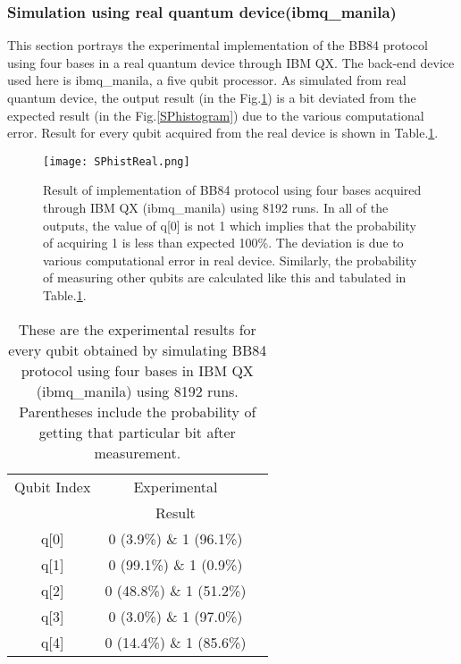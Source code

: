 \documentclass[superscriptaddress,twocolumn,showpacs,prb,floatfix]{revtex4}
\begin{document}
\subsubsection{Simulation using real quantum device(ibmq\_manila)}
\label{SecIIAii}

This section portrays the experimental implementation of the BB84 protocol using four bases in a real quantum device through IBM QX. The back-end device used here is ibmq\_manila, a five qubit processor. As simulated from real quantum device, the output result (in the Fig.\ref{SPhistReal}) is a bit deviated from the expected result (in the Fig.\ref{SPhistogram}) due to the various computational error. Result for every qubit acquired from the real device is shown in Table.\ref{qkdtable5}.

\begin{figure}[H]
    \centering
    \texttt{[image: SPhistReal.png]}
    \caption{Result of implementation of BB84 protocol using four bases acquired through IBM QX (ibmq\_manila) using 8192 runs. In all of the outputs, the value of q[0] is not 1 which implies that the probability of acquiring 1 is less than expected 100\%. The deviation is due to various computational error in real device. Similarly, the probability of measuring other qubits are calculated like this and tabulated in Table.\ref{qkdtable5}.}
    \label{SPhistReal}
\end{figure}

\begin{table}[ht]
    \centering
    \begin{tabular}{|c|c|c|}
    \hline\hline
    Qubit Index & Experimental\\ & Result \\ [0.5ex]
    \hline
    q[0] & 0 (3.9\%) \& 1 (96.1\%)\\[0.5ex]
    \hline
    q[1] & 0 (99.1\%) \& 1 (0.9\%)\\[0.5ex]
    \hline
    q[2] & 0 (48.8\%) \& 1 (51.2\%) \\[0.5ex]
    \hline
    q[3] & 0 (3.0\%) \& 1 (97.0\%) \\[0.5ex]
    \hline
    q[4] & 0 (14.4\%) \& 1 (85.6\%) \\[0.5ex]
    \hline
    \end{tabular}
    \caption{These are the experimental results for every qubit obtained by simulating BB84 protocol using four bases in IBM QX (ibmq\_manila) using 8192 runs. Parentheses include the probability of getting that particular bit after measurement.}
    \label{qkdtable5}
\end{table}
\end{document}
